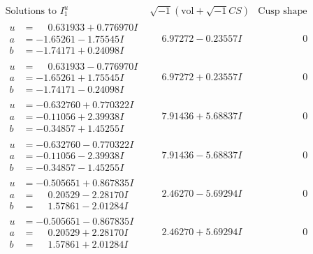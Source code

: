 \documentclass[1p]{elsarticle_modified}
\theoremstyle{definition}
\newcommand{\I}{\sqrt{-1}}
\begin{document}
$$\begin{array}{c|c|c}  
\text{Solutions to }I^u_{1}& \I (\text{vol} + \sqrt{-1}CS) & \text{Cusp shape}\\
 \hline 
\begin{aligned}
u &= \phantom{-}0.631933 + 0.776970 I \\
a &= -1.65261 - 1.75545 I \\
b &= -1.74171 + 0.24098 I\end{aligned}
 & \phantom{-}6.97272 - 0.23557 I & \phantom{-0.000000 } 0 \\ \hline\begin{aligned}
u &= \phantom{-}0.631933 - 0.776970 I \\
a &= -1.65261 + 1.75545 I \\
b &= -1.74171 - 0.24098 I\end{aligned}
 & \phantom{-}6.97272 + 0.23557 I & \phantom{-0.000000 } 0 \\ \hline\begin{aligned}
u &= -0.632760 + 0.770322 I \\
a &= -0.11056 + 2.39938 I \\
b &= -0.34857 + 1.45255 I\end{aligned}
 & \phantom{-}7.91436 + 5.68837 I & \phantom{-0.000000 } 0 \\ \hline\begin{aligned}
u &= -0.632760 - 0.770322 I \\
a &= -0.11056 - 2.39938 I \\
b &= -0.34857 - 1.45255 I\end{aligned}
 & \phantom{-}7.91436 - 5.68837 I & \phantom{-0.000000 } 0 \\ \hline\begin{aligned}
u &= -0.505651 + 0.867835 I \\
a &= \phantom{-}0.20529 - 2.28170 I \\
b &= \phantom{-}1.57861 - 2.01284 I\end{aligned}
 & \phantom{-}2.46270 - 5.69294 I & \phantom{-0.000000 } 0 \\ \hline\begin{aligned}
u &= -0.505651 - 0.867835 I \\
a &= \phantom{-}0.20529 + 2.28170 I \\
b &= \phantom{-}1.57861 + 2.01284 I\end{aligned}
 & \phantom{-}2.46270 + 5.69294 I & \phantom{-0.000000 } 0 \\ \hline\begin{aligned}

\end{aligned}
\end{array}$$
\end{document}

